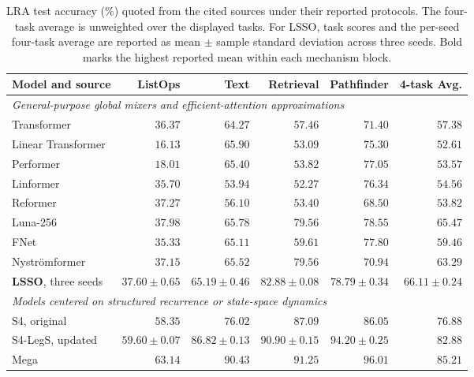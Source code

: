 \documentclass[10pt]{article}
\begin{document}
\begin{table}[H]
\centering
\footnotesize
\setlength{\tabcolsep}{2.5pt}
\caption{LRA test accuracy (\%) quoted from the cited sources under their
reported protocols.  The four-task average is unweighted over the displayed
tasks.  For LSSO, task scores and the per-seed four-task average are reported as
mean $\pm$ sample standard deviation across three seeds.  Bold marks the
highest reported mean within each mechanism block.}
\label{tab:lra-results}
\begin{tabular}{lrrrrr}
\toprule
Model and source & ListOps & Text & Retrieval & Pathfinder & 4-task Avg. \\
\midrule
\multicolumn{6}{l}{\emph{General-purpose global mixers and efficient-attention approximations}} \\
Transformer \cite{tay2021lra} & $36.37$ & $64.27$ & $57.46$ & $71.40$ & $57.38$ \\
Linear Transformer \cite{tay2021lra} & $16.13$ & $\mathbf{65.90}$ & $53.09$ & $75.30$ & $52.61$ \\
Performer \cite{tay2021lra} & $18.01$ & $65.40$ & $53.82$ & $77.05$ & $53.57$ \\
Linformer \cite{tay2021lra} & $35.70$ & $53.94$ & $52.27$ & $76.34$ & $54.56$ \\
Reformer \cite{tay2021lra} & $37.27$ & $56.10$ & $53.40$ & $68.50$ & $53.82$ \\
Luna-256 \cite{ma2021luna}
    & $\mathbf{37.98}$ & $65.78$ & $79.56$ & $78.55$ & $65.47$ \\
FNet \cite{leethorp2022fnet} & $35.33$ & $65.11$ & $59.61$ & $77.80$ & $59.46$ \\
Nystr\"omformer \cite{xiong2021nystrom}
    & $37.15$ & $65.52$ & $79.56$ & $70.94$ & $63.29$ \\
\textbf{LSSO}, three seeds
    & $37.60\pm0.65$ & $65.19\pm0.46$ & $\boldsymbol{82.88\pm0.08}$
    & $\boldsymbol{78.79\pm0.34}$ & $\boldsymbol{66.11\pm0.24}$ \\
\midrule
\multicolumn{6}{l}{\emph{Models centered on structured recurrence or state-space dynamics}} \\
S4, original \cite{gu2022s4}  & $58.35$ & $76.02$ & $87.09$ & $86.05$ & $76.88$ \\
S4-LegS, updated \cite{gu2022hippo}
    & $59.60\pm0.07$ & $86.82\pm0.13$ & $90.90\pm0.15$ & $94.20\pm0.25$ & $82.88$ \\
Mega \cite{ma2023mega} & $\mathbf{63.14}$ & $\mathbf{90.43}$
    & $\mathbf{91.25}$ & $\mathbf{96.01}$ & $\mathbf{85.21}$ \\
\bottomrule
\end{tabular}
\end{table}
\end{document}

